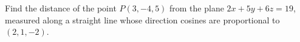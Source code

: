 Find the distance of the point $P(3,-4,5)$ from the plane $2x+5y+6z=19$, measured along a straight line whose direction cosines are proportional to $(2,1,-2)$.
